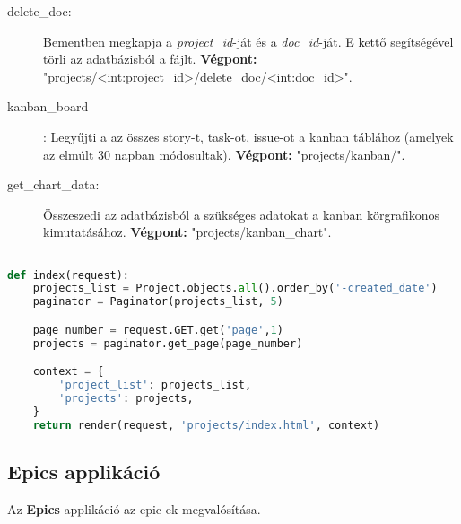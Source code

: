 \begin{itemize}
\begin{description}
		\item[delete\_doc:] Bementben megkapja a \textit{project\_id}-ját és a \textit{doc\_id}-ját. E kettő segítségével törli az adatbázisból a fájlt. \textbf{Végpont:} "projects/<int:project\_id>/delete\_doc/<int:doc\_id>".
		\item[kanban\_board]: Legyűjti a az összes story-t, task-ot, issue-ot a kanban táblához (amelyek az elmúlt 30 napban módosultak). \textbf{Végpont:} "projects/kanban/".
		\item[get\_chart\_data:] Összeszedi az adatbázisból a szükséges adatokat a kanban körgrafikonos kimutatásához. \textbf{Végpont:} "projects/kanban\_chart".
	\end{description}
\end{itemize}

\pagebreak

\begin{lstlisting}[language={python}]

def index(request):
    projects_list = Project.objects.all().order_by('-created_date')
    paginator = Paginator(projects_list, 5)

    page_number = request.GET.get('page',1)
    projects = paginator.get_page(page_number)

    context = {
        'project_list': projects_list,
        'projects': projects,
    }
    return render(request, 'projects/index.html', context)

\end{lstlisting}

\subsection{Epics applikáció}

Az \textbf{Epics} applikáció az epic-ek megvalósítása. 

